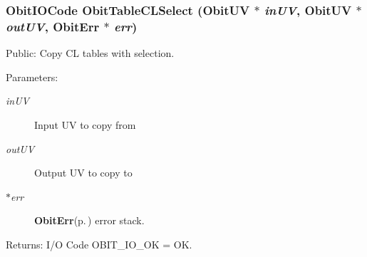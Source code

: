 \subsubsection{\setlength{\rightskip}{0pt plus 5cm}Obit\-IOCode Obit\-Table\-CLSelect ({\bf Obit\-UV} $\ast$ {\em in\-UV}, {\bf Obit\-UV} $\ast$ {\em out\-UV}, {\bf Obit\-Err} $\ast$ {\em err})}\label{ObitTableCLUtil_8c_a1}


Public: Copy CL tables with selection. 

\begin{Desc}
\item[Parameters:]
\begin{description}
\item[{\em in\-UV}]Input UV to copy from \item[{\em out\-UV}]Output UV to copy to \item[{\em $\ast$err}]{\bf Obit\-Err}{\rm (p.\,\pageref{structObitErr})} error stack. \end{description}
\end{Desc}
\begin{Desc}
\item[Returns:]I/O Code OBIT\_\-IO\_\-OK = OK. \end{Desc}
